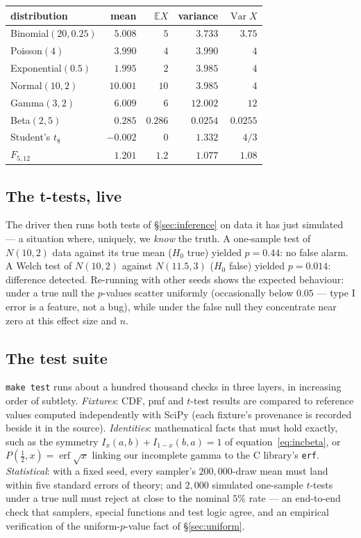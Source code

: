 \documentclass[11pt]{article}
\numberwithin{equation}{section}
\newcommand{\E}{\mathbb{E}}
\newcommand{\Var}{\operatorname{Var}}
\begin{document}
\begin{center}\small
\begin{tabular}{lrrrr}
\toprule
distribution & mean & $\E X$ & variance & $\Var X$ \\
\midrule
Binomial$(20,0.25)$ & $5.008$  & $5$    & $3.733$  & $3.75$ \\
Poisson$(4)$        & $3.990$  & $4$    & $3.990$  & $4$ \\
Exponential$(0.5)$  & $1.995$  & $2$    & $3.985$  & $4$ \\
Normal$(10,2)$      & $10.001$ & $10$   & $3.985$  & $4$ \\
Gamma$(3,2)$        & $6.009$  & $6$    & $12.002$ & $12$ \\
Beta$(2,5)$         & $0.285$  & $0.286$& $0.0254$ & $0.0255$ \\
Student's $t_8$     & $-0.002$ & $0$    & $1.332$  & $4/3$ \\
$F_{5,12}$          & $1.201$  & $1.2$  & $1.077$  & $1.08$ \\
\bottomrule
\end{tabular}
\end{center}

\subsection{The t-tests, live}\label{sec:demos}

The driver then runs both tests of \S\ref{sec:inference} on data it has
just simulated --- a situation where, uniquely, we \emph{know} the truth.
A one-sample test of $N(10,2)$ data against its true mean ($H_0$ true)
yielded $p=0.44$: no false alarm.  A Welch test of $N(10,2)$ against
$N(11.5,3)$ ($H_0$ false) yielded $p=0.014$: difference detected.
Re-running with other seeds shows the expected behaviour: under a true
null the $p$-values scatter uniformly (occasionally below $0.05$ --- type
I error is a feature, not a bug), while under the false null they
concentrate near zero at this effect size and $n$.

\subsection{The test suite}\label{sec:tests}

\texttt{make test} runs about a hundred thousand checks in three layers,
in increasing order of subtlety.  \emph{Fixtures}: CDF, pmf and $t$-test
results are compared to reference values computed independently with
SciPy (each fixture's provenance is recorded beside it in the source).
\emph{Identities}: mathematical facts that must hold exactly, such as the
symmetry $I_x(a,b)+I_{1-x}(b,a)=1$ of equation~\eqref{eq:incbeta}, or
$P(\tfrac12,x)=\operatorname{erf}\sqrt{x}$ linking our incomplete gamma
to the C library's \texttt{erf}.  \emph{Statistical}: with a fixed seed,
every sampler's $200{,}000$-draw mean must land within five standard
errors of theory; and $2{,}000$ simulated one-sample $t$-tests under a
true null must reject at close to the nominal $5\%$ rate --- an
end-to-end check that samplers, special functions and test logic agree,
and an empirical verification of the uniform-$p$-value fact of
\S\ref{sec:uniform}.
\end{document}
